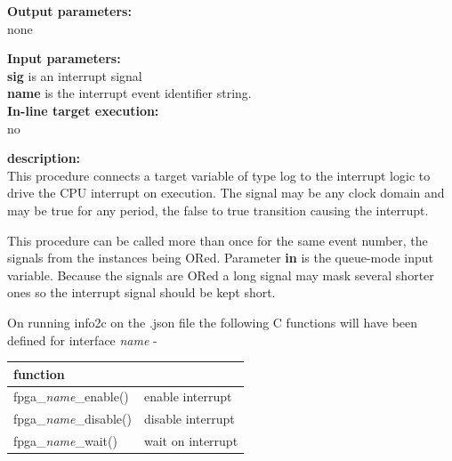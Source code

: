             {\bf Output parameters:} \\
            none

            {\bf Input parameters:} \\            
            {\bf sig} is an interrupt signal \\
            {\bf name} is the interrupt event identifier string. \\
        
            {\bf In-line target execution:} \\
            no

            {\bf description:} \\
            This procedure connects a target variable of type log to the interrupt
            logic to drive the CPU interrupt on execution. The signal may
            be any clock domain and may be true for any period, the false to
            true transition causing the interrupt.
            
                This procedure can be called more than once for the same event number, the
                signals from the instances being ORed. Parameter {\bf in} is the queue-mode
                input variable. Because the signals are ORed a long signal may mask several
                shorter ones so the interrupt signal should be kept short.
            
            On running info2c on the .json file the following C functions will have been
            defined for interface {\em name} -
            
            \begin{tabular}{| l | l |}
            \hline
            function                     &                    \\ \hline \hline
            fpga\_{\em name}\_enable()   & enable interrupt   \\ \hline
            fpga\_{\em name}\_disable()  & disable interrupt  \\ \hline 
            fpga\_{\em name}\_wait()     & wait on interrupt  \\ \hline  
            \end{tabular}
            
